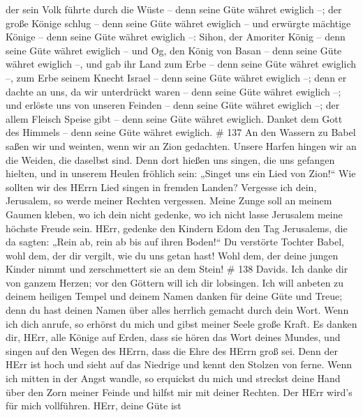 der sein Volk führte durch die Wüste -- denn seine Güte währet ewiglich
--;  der große Könige schlug -- denn seine Güte währet
ewiglich --  und erwürgte mächtige Könige -- denn seine
Güte währet ewiglich --:  Sihon, der Amoriter König -- denn
seine Güte währet ewiglich --  und Og, den König von Basan
-- denn seine Güte währet ewiglich --,  und gab ihr Land
zum Erbe -- denn seine Güte währet ewiglich --,  zum Erbe
seinem Knecht Israel -- denn seine Güte währet ewiglich --;
 denn er dachte an uns, da wir unterdrückt waren -- denn
seine Güte währet ewiglich --;  und erlöste uns von unseren
Feinden -- denn seine Güte währet ewiglich --;  der allem
Fleisch Speise gibt -- denn seine Güte währet ewiglich. 
Danket dem Gott des Himmels -- denn seine Güte währet ewiglich. \# 137
 An den Wassern zu Babel saßen wir und weinten, wenn wir an
Zion gedachten.  Unsere Harfen hingen wir an die Weiden, die
daselbst sind.  Denn dort hießen uns singen, die uns
gefangen hielten, und in unserem Heulen fröhlich sein: „Singet uns ein
Lied von Zion!{}``  Wie sollten wir des HErrn Lied singen in
fremden Landen?  Vergesse ich dein, Jerusalem, so werde
meiner Rechten vergessen.  Meine Zunge soll an meinem Gaumen
kleben, wo ich dein nicht gedenke, wo ich nicht lasse Jerusalem meine
höchste Freude sein.  HErr, gedenke den Kindern Edom den Tag
Jerusalems, die da sagten: „Rein ab, rein ab bis auf ihren Boden!{}``
 Du verstörte Tochter Babel, wohl dem, der dir vergilt, wie
du uns getan hast!  Wohl dem, der deine jungen Kinder nimmt
und zerschmettert sie an dem Stein! \# 138  Davids. Ich
danke dir von ganzem Herzen; vor den Göttern will ich dir lobsingen.
 Ich will anbeten zu deinem heiligen Tempel und deinem Namen
danken für deine Güte und Treue; denn du hast deinen Namen über alles
herrlich gemacht durch dein Wort.  Wenn ich dich anrufe, so
erhörst du mich und gibst meiner Seele große Kraft.  Es
danken dir, HErr, alle Könige auf Erden, dass sie hören das Wort deines
Mundes,  und singen auf den Wegen des HErrn, dass die Ehre
des HErrn groß sei.  Denn der HErr ist hoch und sieht auf
das Niedrige und kennt den Stolzen von ferne.  Wenn ich
mitten in der Angst wandle, so erquickst du mich und streckst deine Hand
über den Zorn meiner Feinde und hilfst mir mit deiner Rechten.
 Der HErr wird's für mich vollführen. HErr, deine Güte ist
